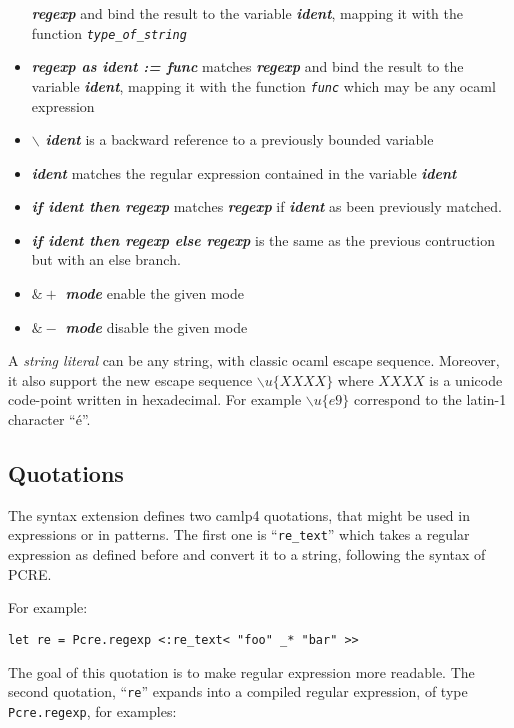 \documentclass{article}
\begin{document}
\begin{itemize}
  \textbf{\emph{regexp}} and bind the result to the variable
  \textbf{\emph{ident}}, mapping it with the function
  \texttt{\emph{type\_of\_string}}
\item \textbf{\emph{regexp as ident := func}} matches
  \textbf{\emph{regexp}} and bind the result to the variable
  \textbf{\emph{ident}}, mapping it with the function
  \texttt{\emph{func}} which may be any ocaml expression
\item \textbf{\emph{$\backslash$ ident}} is a backward reference to a
  previously bounded variable
\item \textbf{\emph{ident}} matches the regular expression contained
  in the variable \textbf{\emph{ident}}
\item \textbf{\emph{if ident then regexp}} matches
  \textbf{\emph{regexp}} if \textbf{\emph{ident}} as been previously
  matched.
\item \textbf{\emph{if ident then regexp else regexp}} is the same as
  the previous contruction but with an else branch.
\item \textbf{\emph{$\&+$ mode}} enable the given mode
\item \textbf{\emph{$\&-$ mode}} disable the given mode
\end{itemize}

A \emph{string literal} can be any string, with classic ocaml escape
sequence. Moreover, it also support the new escape sequence
$\backslash u\{XXXX\}$ where $XXXX$ is a unicode code-point written in
hexadecimal. For example $\backslash u\{e9\}$ correspond to the
latin-1 character ``é''.

\subsection{Quotations}

The syntax extension defines two camlp4 quotations, that might be used
in expressions or in patterns. The first one is ``\texttt{re\_text}'' which
takes a regular expression as defined before and convert it to a
string, following the syntax of PCRE.

For example:

\begin{verbatim}
let re = Pcre.regexp <:re_text< "foo" _* "bar" >>
\end{verbatim}

The goal of this quotation is to make regular expression more
readable. The second quotation, ``\texttt{re}'' expands into a
compiled regular expression, of type \texttt{Pcre.regexp}, for examples:
\end{document}
